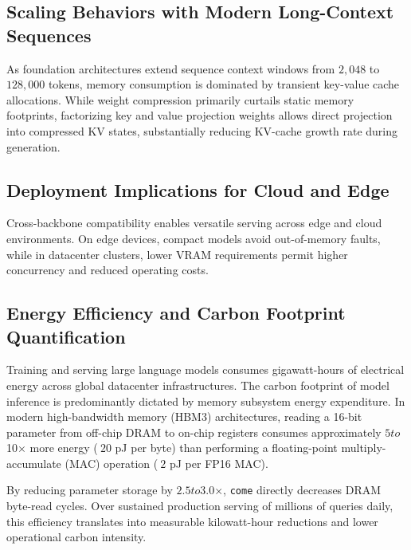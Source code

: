 \subsection{Scaling Behaviors with Modern Long-Context Sequences}
As foundation architectures extend sequence context windows from $2{,}048$ to $128{,}000$ tokens, memory consumption is dominated by transient key-value cache allocations. While weight compression primarily curtails static memory footprints, factorizing key and value projection weights allows direct projection into compressed KV states, substantially reducing KV-cache growth rate during generation.

\subsection{Deployment Implications for Cloud and Edge}
Cross-backbone compatibility enables versatile serving across edge and cloud environments. On edge devices, compact models avoid out-of-memory faults, while in datacenter clusters, lower VRAM requirements permit higher concurrency and reduced operating costs.

\subsection{Energy Efficiency and Carbon Footprint Quantification}
Training and serving large language models consumes gigawatt-hours of electrical energy across global datacenter infrastructures. The carbon footprint of model inference is predominantly dictated by memory subsystem energy expenditure. In modern high-bandwidth memory (HBM3) architectures, reading a 16-bit parameter from off-chip DRAM to on-chip registers consumes approximately $5$\times$ to $10$\times$ more energy ($~20$ pJ per byte) than performing a floating-point multiply-accumulate (MAC) operation ($~2$ pJ per FP16 MAC).

By reducing parameter storage by $2.5$\times$ to $3.0$\times$, \texttt{come} directly decreases DRAM byte-read cycles. Over sustained production serving of millions of queries daily, this efficiency translates into measurable kilowatt-hour reductions and lower operational carbon intensity.
